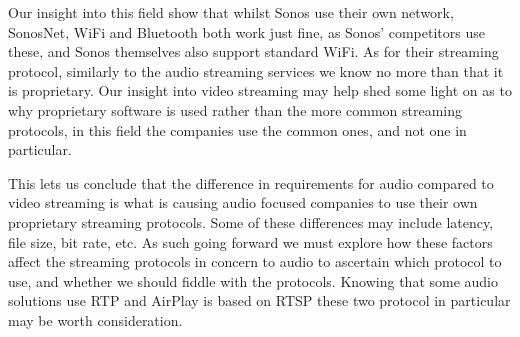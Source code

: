 Our insight into this field show that whilst Sonos use their own network, SonosNet, WiFi and Bluetooth both work just fine, as Sonos' competitors use these, and Sonos themselves also support standard WiFi.
As for their streaming protocol, similarly to the audio streaming services we know no more than that it is proprietary.
Our insight into video streaming may help shed some light on as to why proprietary software is used rather than the more common streaming protocols, in this field the companies use the common ones, and not one in particular.

This lets us conclude that the difference in requirements for audio compared to video streaming is what is causing audio focused companies to use their own proprietary streaming protocols.
Some of these differences may include latency, file size, bit rate, etc.
As such going forward we must explore how these factors affect the streaming protocols in concern to audio to ascertain which protocol to use, and whether we should fiddle with the protocols.
Knowing that some audio solutions use \ac{RTP} and AirPlay is based on \ac{RTSP} these two protocol in particular may be worth consideration.












